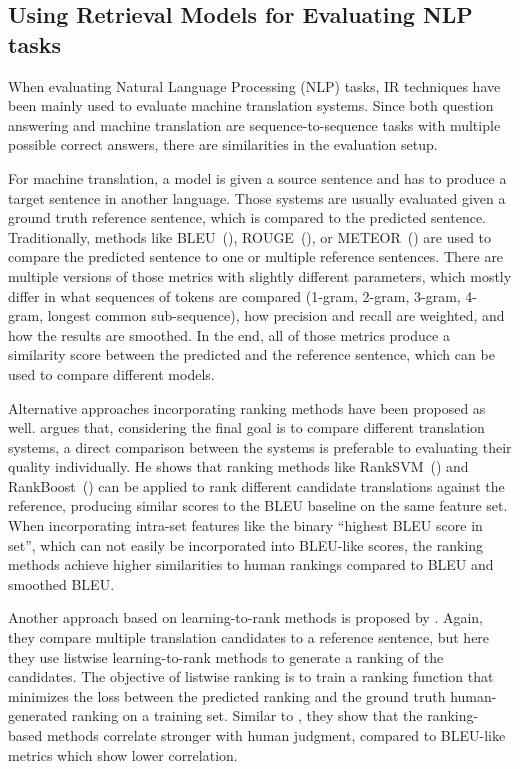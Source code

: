 \subsection{Using Retrieval Models for Evaluating NLP tasks}\label{sec:eval-mts-ir}
When evaluating Natural Language Processing (NLP) tasks, IR techniques have been mainly used to evaluate machine translation systems.
Since both question answering and machine translation are sequence-to-sequence tasks with multiple possible correct answers, there are similarities in the evaluation setup.

For machine translation, a model is given a source sentence and has to produce a target sentence in another language.
Those systems are usually evaluated given a ground truth reference sentence, which is compared to the predicted sentence.
Traditionally, methods like BLEU~(\cite{papineni:2002:Bleu}), ROUGE~(\cite{lin:2004:Rouge}), or METEOR~(\cite{banerjee:2005:METEOR}) are used to compare the predicted sentence to one or multiple reference sentences.
There are multiple versions of those metrics with slightly different parameters, which mostly differ in what sequences of tokens are compared (1-gram, 2-gram, 3-gram, 4-gram, longest common sub-sequence), how precision and recall are weighted, and how the results are smoothed.
In the end, all of those metrics produce a similarity score between the predicted and the reference sentence, which can be used to compare different models.

Alternative approaches incorporating ranking methods have been proposed as well.
\cite{duh:2008:Ranking} argues that, considering the final goal is to compare different translation systems, a direct comparison between the systems is preferable to evaluating their quality individually.
He shows that ranking methods like RankSVM~(\cite{joachims:2002:Optimizing}) and RankBoost~(\cite{freund:2003:An}) can be applied to rank different candidate translations against the reference, producing similar scores to the BLEU baseline on the same feature set.
When incorporating intra-set features like the binary ``highest BLEU score in set'', which can not easily be incorporated into BLEU-like scores, the ranking methods achieve higher similarities to human rankings compared to BLEU and smoothed BLEU.

Another approach based on learning-to-rank methods is proposed by \cite{li:2013:Listwise}.
Again, they compare multiple translation candidates to a reference sentence, but here they use listwise learning-to-rank methods to generate a ranking of the candidates.
The objective of listwise ranking is to train a ranking function that minimizes the loss between the predicted ranking and the ground truth human-generated ranking on a training set.
Similar to \cite{duh:2008:Ranking}, they show that the ranking-based methods correlate stronger with human judgment, compared to BLEU-like metrics which show lower correlation.

